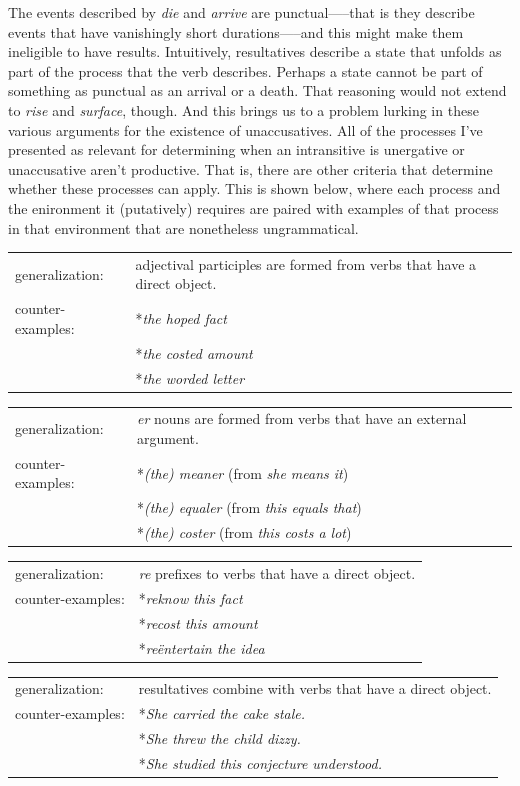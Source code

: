 The events described by \textit{die} and \textit{arrive} are punctual—--that is they describe events that have vanishingly short durations—--and this might make them ineligible to have results. Intuitively, resultatives describe a state that unfolds as part of the process that the verb describes. Perhaps a state cannot be part of something as punctual as an arrival or a death. That reasoning would not extend to \textit{rise} and \textit{surface}, though. And this brings us to a problem lurking in these various arguments for the existence of unaccusatives. All of the processes I've presented as relevant for determining when an intransitive is unergative or unaccusative aren't productive. That is, there are other criteria that determine whether these processes can apply. This is shown below, where each process and the enironment it (putatively) requires are paired with examples of that process in that environment that are nonetheless ungrammatical.
\begin{exe}
\raggedright
	\ex \label{ex3:nocorrel}
	\begin{xlist}
		\ex 
		\begin{tabular}{ll}
			generalization: & adjectival participles are formed from verbs that have a direct object.\\ 
			counter-examples: & *\textit{the hoped fact}\\ 
			& *\textit{the costed amount}\\
			& *\textit{the worded letter}
		\end{tabular}
		\ex 
		\begin{tabular}{ll}
			generalization: & \textit{er} nouns are formed from verbs that have an external argument.\\ 
			counter-examples: & *\textit{(the) meaner} (from \textit{she means it})\\ 
			& *\textit{(the) equaler} (from \textit{this equals that})\\
			& *\textit{(the) coster} (from \textit{this costs a lot})
		\end{tabular}
		\ex 
		\begin{tabular}{ll}
			generalization: & \textit{re} prefixes to verbs that have a direct object.\\ 
			counter-examples: & *\textit{reknow this fact}\\ 
			& *\textit{recost this amount}\\
			& *\textit{re\"entertain the idea}
		\end{tabular}
		\ex 
		\begin{tabular}{ll}
			generalization: & resultatives combine with verbs that have a direct object.\\ 
			counter-examples: & *\textit{She carried the cake stale.}\\ 
			& *\textit{She threw the child dizzy.}\\
			& *\textit{She studied this conjecture understood.}
		\end{tabular}
	\end{xlist}
\end{exe}
